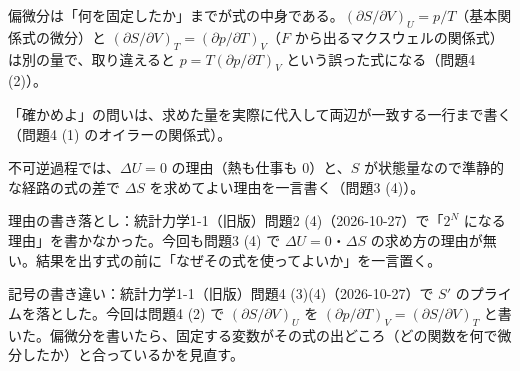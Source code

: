 \documentclass[uplatex,dvipdfmx,a4paper,11pt]{jsarticle}
\begin{document}
\matome
\begin{saitenichiran}
\end{saitenichiran}
\begin{daiji}
  \item 偏微分は「何を固定したか」までが式の中身である。$(\partial S/\partial V)_{U}=p/T$（基本関係式の微分）と $(\partial S/\partial V)_{T}=(\partial p/\partial T)_{V}$（$F$ から出るマクスウェルの関係式）は別の量で、取り違えると $p=T(\partial p/\partial T)_{V}$ という誤った式になる（問題4 (2)）。
  \item 「確かめよ」の問いは、求めた量を実際に代入して両辺が一致する一行まで書く（問題4 (1) のオイラーの関係式）。
  \item 不可逆過程では、$\Delta U=0$ の理由（熱も仕事も 0）と、$S$ が状態量なので準静的な経路の式の差で $\Delta S$ を求めてよい理由を一言書く（問題3 (4)）。
\end{daiji}
\begin{maemo}
  \item 理由の書き落とし：統計力学1-1（旧版）問題2 (4)（2026-10-27）で「$2^{N}$ になる理由」を書かなかった。今回も問題3 (4) で $\Delta U=0$・$\Delta S$ の求め方の理由が無い。結果を出す式の前に「なぜその式を使ってよいか」を一言置く。
  \item 記号の書き違い：統計力学1-1（旧版）問題4 (3)(4)（2026-10-27）で $S'$ のプライムを落とした。今回は問題4 (2) で $(\partial S/\partial V)_{U}$ を $(\partial p/\partial T)_{V}=(\partial S/\partial V)_{T}$ と書いた。偏微分を書いたら、固定する変数がその式の出どころ（どの関数を何で微分したか）と合っているかを見直す。
\end{maemo}
\end{document}
